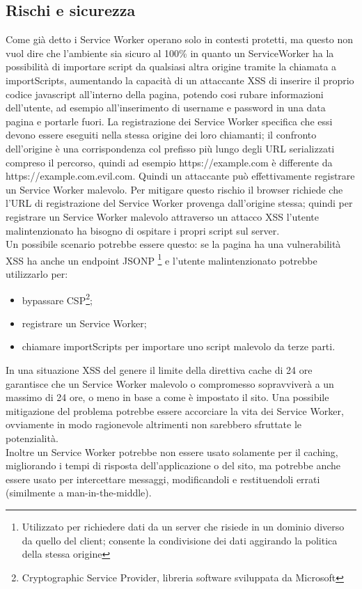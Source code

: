 \documentclass[11pt ,a4paper , twoside , openright ]{article}
\begin{document}
\subsection{Rischi e sicurezza}
Come già detto i Service Worker operano solo in contesti protetti, ma questo non vuol dire che l'ambiente sia sicuro al 100\% in quanto un ServiceWorker ha la possibilità di importare script da qualsiasi altra origine tramite la chiamata a importScripts, aumentando la capacità di un attaccante XSS di inserire il proprio codice javascript all'interno della pagina, potendo cosi rubare informazioni dell'utente, ad esempio all'inserimento di username e password in una data pagina e portarle fuori. La registrazione dei Service Worker specifica che essi devono essere eseguiti nella stessa origine dei loro chiamanti; il confronto dell'origine è una corrispondenza col prefisso più lungo degli URL serializzati compreso il percorso, quindi ad esempio https://example.com è differente da https://example.com.evil.com. Quindi un attaccante può effettivamente registrare un Service Worker malevolo. Per mitigare questo rischio il browser richiede che l'URL di registrazione del Service Worker provenga dall'origine stessa; quindi per registrare un Service Worker malevolo attraverso un attacco XSS l'utente malintenzionato ha bisogno di ospitare i propri script sul server.
\\
Un possibile scenario potrebbe essere questo: se la pagina ha una vulnerabilità XSS ha anche un endpoint JSONP \footnote{Utilizzato per richiedere dati da un server che risiede in un dominio diverso da quello del client; consente la condivisione dei dati aggirando la politica della stessa origine} e l'utente malintenzionato potrebbe utilizzarlo per:
\begin{itemize}
	\item bypassare CSP\footnote{Cryptographic Service Provider, libreria software sviluppata da Microsoft};
	\item registrare un Service Worker; 
	\item chiamare importScripts per importare uno script malevolo da terze parti.
\end{itemize}
In una situazione XSS del genere il limite della direttiva cache di 24 ore garantisce che un Service Worker malevolo o compromesso sopravviverà a un massimo di 24 ore, o meno in base a come è impostato il sito. Una possibile mitigazione del problema potrebbe essere accorciare la vita dei Service Worker, ovviamente in modo ragionevole altrimenti non sarebbero sfruttate le potenzialità.
\\
Inoltre un Service Worker potrebbe non essere usato solamente per il caching, migliorando i tempi di risposta dell'applicazione o del sito, ma potrebbe anche essere usato per intercettare messaggi, modificandoli e restituendoli errati (similmente a man-in-the-middle).
\end{document}

